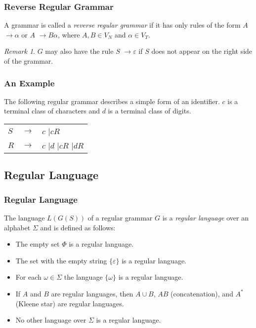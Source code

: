 \documentclass{beamer}
\theoremstyle{remark}
\newtheorem{remark}[theorem]{Remark}
\newcommand{\emptystring}{\varepsilon}
\newenvironment{grammar}
	{\begin{tabular}[b]{lcl}}
	{\end{tabular}}
\newcommand{\rewritten}{$\to$}
\newcommand{\alternative}{$\mid$\;}
\begin{document}
\begin{frame}
	\frametitle{Reverse Regular Grammar}
	\begin{definition}
		A grammar is called a {\em reverse regular grammar} if it has only rules of the form $A$ \rewritten $\alpha$ or
		$A$ \rewritten $B \alpha$, where $A, B \in V_N$ and $\alpha \in V_T$.
	\end{definition}
	
	\pause
	
	\begin{remark}
		$G$ may also have the rule $S$ \rewritten $\varepsilon$ if $S$ does not appear on the right side of the grammar.
	\end{remark}
\end{frame}

\begin{frame}
	\frametitle{An Example}
	\begin{example}
		The following regular grammar describes a simple form of an identifier. $c$ is a terminal class
		of characters and $d$ is a terminal class of digits.
		
		\begin{grammar}
			$S$ & \rewritten & $c$ \alternative $cR$\\
			$R$ & \rewritten & $c$ \alternative $d$ \alternative $cR$ \alternative $dR$
		\end{grammar}
	\end{example}
\end{frame}

\subsection{Regular Language}
\begin{frame}
	\frametitle{Regular Language}
	\begin{definition}
		The language $L(G(S))$ of a regular grammar $G$ is a {\em regular language} over an alphabet $\Sigma$ and is defined as follows:
		\begin{itemize}
			\pause
			\item The empty set $\Phi$ is a regular language.
			\pause
			\item The set with the empty string $\{\emptystring \}$ is a regular language.
			\pause
			\item For each $\omega \in \Sigma$ the language $\{\omega\}$ is a regular language.
			\pause
			\item If $A$ and $B$ are regular languages, then $A \cup B$, $AB$ (concatenation), and $A^*$ (Kleene star) are
			regular languages.
			\pause
			\item No other language over $\Sigma$ is a regular language.
		\end{itemize}
	\end{definition}
\end{frame}
\end{document}

